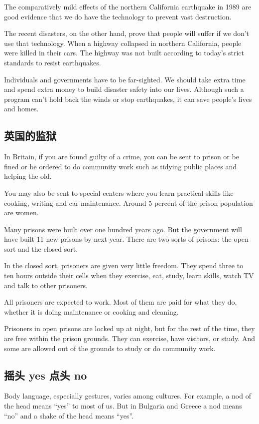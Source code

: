 The comparatively mild effects of the northern California
earthquake in 1989 are good evidence that we do
have the technology to prevent vast destruction.

The recent disasters, on the other hand, prove that people
will suffer if we don't use that technology. When a highway
collapsed in northern California, people were killed in their
cars. The highway was not built according to today's
strict standards to resist earthquakes.

Individuals and governments have to be far-sighted. We
should take extra time and spend extra money to build disaster
safety into our lives. Although such a program can't
hold back the winds or stop earthquakes, it can save people's
lives and homes.
\subsection{英国的监狱}
\begin{margintable}\vspace{-2cm}\footnotesize
\end{margintable}
In Britain, if you are found guilty of a crime, you can be
sent to prison or be fined or be ordered to do community
work such as tidying public places and helping the old.

You may also be sent to special centers where you learn
practical skills like cooking, writing and car maintenance.
Around 5 percent of the prison population are women.

Many prisons were built over one hundred years ago. But
the government will have built 11 new prisons by next
year. There are two sorts of prisons: the open sort and the
closed sort.

In the closed sort, prisoners are given very little freedom.
They spend three to ten hours outside their cells when they
exercise, eat, study, learn skills, watch TV and talk to other
prisoners.

All prisoners are expected to work. Most of them are
paid for what they do, whether it is doing maintenance or
cooking and cleaning.


Prisoners in open prisons are locked up at night, but for
the rest of the time, they are free within the prison grounds.
They can exercise, have visitors, or study. And some
are allowed out of the grounds to study or do community
work.
\subsection{摇头 yes 点头 no}
\begin{margintable}\vspace{-2cm}\footnotesize
\end{margintable}
Body language, especially gestures, varies among cultures.
For example, a nod of the head means “yes” to most
of us. But in Bulgaria and Greece a nod means “no”
and a shake of the head means “yes”.

